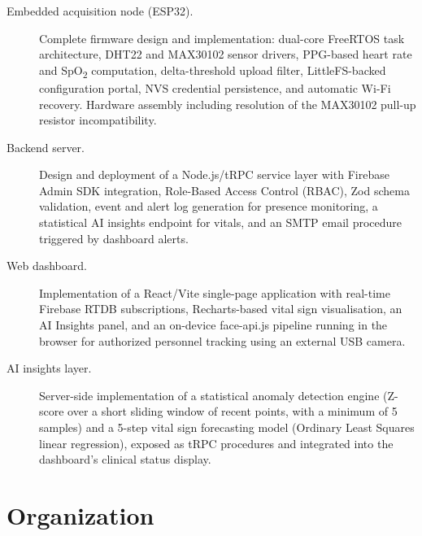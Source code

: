 \begin{description}
	\item[Embedded acquisition node (ESP32).]
	      Complete firmware design and implementation: dual-core FreeRTOS task architecture,
	      DHT22 and MAX30102 sensor drivers, PPG-based heart rate and SpO\textsubscript{2}
	      computation, delta-threshold upload filter, LittleFS-backed configuration portal,
	      NVS credential persistence, and automatic Wi-Fi recovery. Hardware assembly
	      including resolution of the MAX30102 pull-up resistor incompatibility.\cite{esp32_datasheet,dht22_datasheet,max30102_datasheet}

	\item[Backend server.]
	      Design and deployment of a Node.js/tRPC service layer with Firebase Admin SDK
	      integration, Role-Based Access Control (RBAC), Zod schema validation, event
	      and alert log generation for presence monitoring, a statistical AI insights
	      endpoint for vitals, and an SMTP email procedure triggered by dashboard alerts.
\cite{trpc,firebase_auth,firebase_firestore,firebase_rtdb}

	\item[Web dashboard.]
		      Implementation of a React/Vite single-page application with real-time Firebase
		      RTDB subscriptions, Recharts-based vital sign visualisation, an AI Insights
		      panel, and an on-device face-api.js pipeline running in the browser for
		      authorized personnel tracking using an external USB camera.\cite{react,recharts,faceapi,firebase_rtdb}

	\item[AI insights layer.]
		      Server-side implementation of a statistical anomaly detection engine (Z-score
		      over a short sliding window of recent points, with a minimum of 5 samples)
		      and a 5-step vital sign forecasting model (Ordinary Least Squares linear
		      regression), exposed as tRPC procedures and integrated into the dashboard's
		      clinical status display.\cite{trpc}
\end{description}

\section{Organization}

